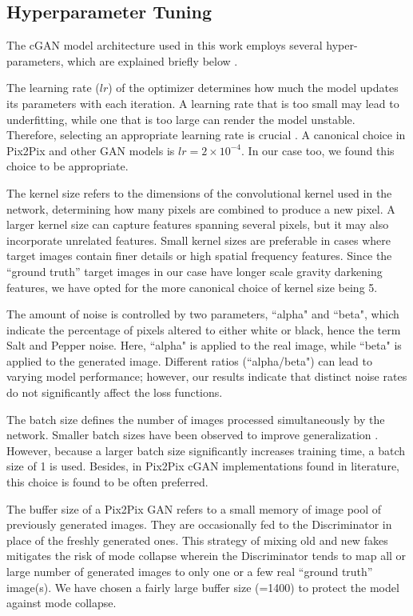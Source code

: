 \subsection{Hyperparameter Tuning}
The cGAN model architecture used in this work employs several hyper-parameters, which are explained briefly below \citep[for a more in-depth discussion, see][]{murphy2022probabilistic}.

The learning rate ($lr$) of the optimizer determines how much the model updates its parameters with each iteration. A learning rate that is too small may lead to underfitting, while one that is too large can render the model unstable. Therefore, selecting an appropriate learning rate is crucial \citep{murphy2022probabilistic}. A canonical choice in Pix2Pix and other GAN models is $lr = 2\times10^{-4}$. In our case too, we found this choice to be appropriate.

The kernel size refers to the dimensions of the convolutional kernel used in the network, determining how many pixels are combined to produce a new pixel. A larger kernel size can capture features spanning several pixels, but it may also incorporate unrelated features. Small kernel sizes are preferable in cases where target images contain finer details or high spatial frequency features. Since the ``ground truth'' target images in our case have longer scale gravity darkening features, we have opted for the more canonical choice of kernel size being 5.

The amount of noise is controlled by two parameters, ``alpha" and ``beta", which indicate the percentage of pixels altered to either white or black, hence the term Salt and Pepper noise. Here, ``alpha" is applied to the real image, while ``beta" is applied to the generated image. Different ratios (``alpha/beta") can lead to varying model performance; however, our results indicate that distinct noise rates do not significantly affect the loss functions. 

The batch size defines the number of images processed simultaneously by the network. Smaller batch sizes have been observed to improve generalization \citep{prince2023understanding}. However, because a larger batch size significantly increases training time, a batch size of 1 is used. Besides, in Pix2Pix cGAN implementations found in literature, this choice is found to be often preferred.

The buffer size of a Pix2Pix GAN refers to a small memory of image pool of previously generated images. They are occasionally fed to the Discriminator in place of the freshly generated ones. This strategy of mixing old and new fakes  mitigates the risk of mode collapse wherein the Discriminator tends to map all or large number of generated images to only one or a few real ``ground truth'' image(s). We have chosen a fairly large buffer size (=1400) to protect the model against mode collapse.

